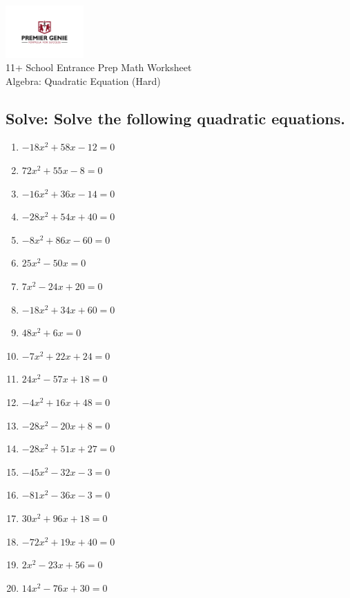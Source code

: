 \documentclass{article}
\begin{document}
\begin{center}
\includegraphics[width=3cm]{PREMGENIEJPG.jpg}\\
{\Large 11+ School Entrance Prep Math Worksheet}\\
{\Medium Algebra: Quadratic Equation (Hard)}\\

\end{center}

\subsection*{Solve: Solve the following quadratic equations.}

\begin{enumerate}
\item $\displaystyle - 18 x^{2} + 58 x - 12 = 0 $ \ 
\item $\displaystyle 72 x^{2} + 55 x - 8 = 0 $ \ 
\item $\displaystyle - 16 x^{2} + 36 x - 14 = 0 $ \ 
\item $\displaystyle - 28 x^{2} + 54 x + 40 = 0 $ \ 
\item $\displaystyle - 8 x^{2} + 86 x - 60 = 0 $ \ 
\item $\displaystyle 25 x^{2} - 50 x = 0 $ \ 
\item $\displaystyle 7 x^{2} - 24 x + 20 = 0 $ \ 
\item $\displaystyle - 18 x^{2} + 34 x + 60 = 0 $ \ 
\item $\displaystyle 48 x^{2} + 6 x = 0 $ \ 
\item $\displaystyle - 7 x^{2} + 22 x + 24 = 0 $ \ 
\item $\displaystyle 24 x^{2} - 57 x + 18 = 0 $ \ 
\item $\displaystyle - 4 x^{2} + 16 x + 48 = 0 $ \ 
\item $\displaystyle - 28 x^{2} - 20 x + 8 = 0 $ \ 
\item $\displaystyle - 28 x^{2} + 51 x + 27 = 0 $ \ 
\item $\displaystyle - 45 x^{2} - 32 x - 3 = 0 $ \ 
\item $\displaystyle - 81 x^{2} - 36 x - 3 = 0 $ \ 
\item $\displaystyle 30 x^{2} + 96 x + 18 = 0 $ \ 
\item $\displaystyle - 72 x^{2} + 19 x + 40 = 0 $ \ 
\item $\displaystyle 2 x^{2} - 23 x + 56 = 0 $ \ 
\item $\displaystyle 14 x^{2} - 76 x + 30 = 0 $ \ 


\end{enumerate}
\end{document}
